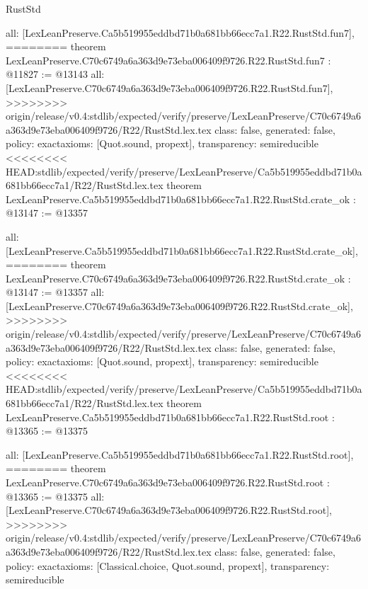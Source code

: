 \begin{lexlean}{RustStd}
\begin{coremodule}
{\begin{coremodule}
{{{{{{{{{{  all: [LexLeanPreserve.Ca5b519955eddbd71b0a681bb66ecc7a1.R22.RustStd.fun7],
========
theorem LexLeanPreserve.C70c6749a6a363d9e73eba006409f9726.R22.RustStd.fun7 : @11827 := @13143 {
  all: [LexLeanPreserve.C70c6749a6a363d9e73eba006409f9726.R22.RustStd.fun7],
>>>>>>>> origin/release/v0.4:stdlib/expected/verify/preserve/LexLeanPreserve/C70c6749a6a363d9e73eba006409f9726/R22/RustStd.lex.tex
  class: false,
  generated: false,
  policy: exact{axioms: [Quot.sound, propext]},
  transparency: semireducible
}
<<<<<<<< HEAD:stdlib/expected/verify/preserve/LexLeanPreserve/Ca5b519955eddbd71b0a681bb66ecc7a1/R22/RustStd.lex.tex
theorem LexLeanPreserve.Ca5b519955eddbd71b0a681bb66ecc7a1.R22.RustStd.crate_ok : @13147 := @13357 {
  all: [LexLeanPreserve.Ca5b519955eddbd71b0a681bb66ecc7a1.R22.RustStd.crate_ok],
========
theorem LexLeanPreserve.C70c6749a6a363d9e73eba006409f9726.R22.RustStd.crate_ok : @13147 := @13357 {
  all: [LexLeanPreserve.C70c6749a6a363d9e73eba006409f9726.R22.RustStd.crate_ok],
>>>>>>>> origin/release/v0.4:stdlib/expected/verify/preserve/LexLeanPreserve/C70c6749a6a363d9e73eba006409f9726/R22/RustStd.lex.tex
  class: false,
  generated: false,
  policy: exact{axioms: [Quot.sound, propext]},
  transparency: semireducible
}
<<<<<<<< HEAD:stdlib/expected/verify/preserve/LexLeanPreserve/Ca5b519955eddbd71b0a681bb66ecc7a1/R22/RustStd.lex.tex
theorem LexLeanPreserve.Ca5b519955eddbd71b0a681bb66ecc7a1.R22.RustStd.root : @13365 := @13375 {
  all: [LexLeanPreserve.Ca5b519955eddbd71b0a681bb66ecc7a1.R22.RustStd.root],
========
theorem LexLeanPreserve.C70c6749a6a363d9e73eba006409f9726.R22.RustStd.root : @13365 := @13375 {
  all: [LexLeanPreserve.C70c6749a6a363d9e73eba006409f9726.R22.RustStd.root],
>>>>>>>> origin/release/v0.4:stdlib/expected/verify/preserve/LexLeanPreserve/C70c6749a6a363d9e73eba006409f9726/R22/RustStd.lex.tex
  class: false,
  generated: false,
  policy: exact{axioms: [Classical.choice, Quot.sound, propext]},
  transparency: semireducible
}

}}}}}}}}}}}}
\end{coremodule}}
\end{coremodule}
\end{lexlean}
